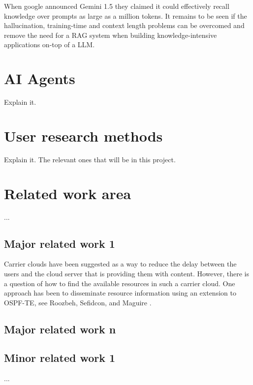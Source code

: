 When google announced Gemini 1.5 \cite{gemini_team_gemini_2024} they claimed it could effectively recall knowledge over prompts as large as a million tokens. It remains to be seen if the hallucination, training-time and context length problems can be overcomed and remove the need for a \gls{RAG} system when building knowledge-intensive applications on-top of a \gls{LLM}.


\section{AI Agents}


Explain it.


\section{User research methods}


Explain it. The relevant ones that will be in this project.


\section{Related work area}




...




\subsection{Major related work 1}


Carrier clouds have been suggested as a way to reduce the delay between the users and the cloud server that is providing them with content. However, there is a question of how to find the available resources in such a carrier cloud. One approach has been to disseminate resource information using an extension to OSPF-TE, see Roozbeh, Sefidcon, and Maguire \cite{roozbeh_resource_2013}.


\subsection{Major related work n}


\subsection{Minor related work 1}


...


